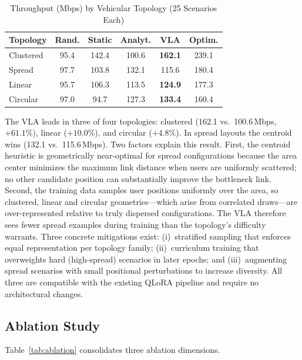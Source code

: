 \documentclass[journal]{IEEEtran}
\begin{document}
\begin{table}[!t]
    \centering
    \caption{Throughput (Mbps) by Vehicular Topology (25 Scenarios Each)}
    \label{tab:by_type}
    \begin{tabular}{lccccc}
        \toprule
        \textbf{Topology} & \textbf{Rand.} & \textbf{Static} & \textbf{Analyt.} & \textbf{VLA} & \textbf{Optim.} \\
        \midrule
        Clustered & 95.4 & 142.4 & 100.6 & \textbf{162.1} & 239.1 \\
        Spread & 97.7 & 103.8 & 132.1 & 115.6 & 180.4 \\
        Linear & 95.7 & 106.3 & 113.5 & \textbf{124.9} & 177.3 \\
        Circular & 97.0 & 94.7 & 127.3 & \textbf{133.4} & 160.4 \\
        \bottomrule
    \end{tabular}
\end{table}

The VLA leads in three of four topologies: clustered (162.1 vs.\ 100.6\,Mbps, $+61.1\%$), linear ($+10.0\%$), and circular ($+4.8\%$). In spread layouts the centroid wins (132.1 vs.\ 115.6\,Mbps). Two factors explain this result. First, the centroid heuristic is geometrically near-optimal for spread configurations because the area center minimizes the maximum link distance when users are uniformly scattered; no other candidate position can substantially improve the bottleneck link. Second, the training data samples user positions uniformly over the area, so clustered, linear and circular geometries---which arise from correlated draws---are over-represented relative to truly dispersed configurations. The VLA therefore sees fewer spread examples during training than the topology's difficulty warrants. Three concrete mitigations exist: (i)~stratified sampling that enforces equal representation per topology family; (ii)~curriculum training that overweights hard (high-spread) scenarios in later epochs; and (iii)~augmenting spread scenarios with small positional perturbations to increase diversity. All three are compatible with the existing QLoRA pipeline and require no architectural changes.

\subsection{Ablation Study}
\label{sec:ablation}

Table~\ref{tab:ablation} consolidates three ablation dimensions.
\end{document}
